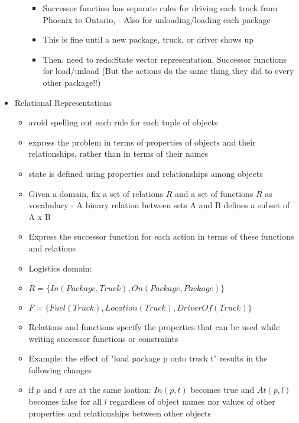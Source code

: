 \documentclass[10pt]{article}
\begin{document}
\begin{itemize}[label=\(\star\), leftmargin=1em, itemsep=-0.3em]
\begin{itemize}[label=\(\star\), leftmargin=1em, itemsep=-0.2em]
        \begin{itemize}[label=\(\star\), leftmargin=1em, itemsep=-0.2em]
            \item Successor function has separate rules for driving each truck from Phoenix to Ontario,  - Also for unloading/loading each package
            \item This is fine until a new package, truck, or driver shows up
            \item Then, need to redo:State vector representation,  Successor functions for load/unload (But the actions do the same thing they did to every other package!!)
        \end{itemize}
\end{itemize}

\item Relational Representations
\begin{itemize}[label=\(\star\), leftmargin=1em, itemsep=-0.2em]

    \item avoid spelling out each rule for each tuple of objects
    \item express the problem in terms of properties of objects and their relationships, rather than in terms of their names
    \item state is defined using properties and relationships among objects
    \item Given a domain, fix a set of relations $R$  and a set of functions $R$ as vocabulary - A binary relation between sets A and B defines a subset of A x B
    \item Express the successor function for each action in terms of these functions and relations
    \item  Logistics domain:
    \item[] $R = \{In(Package,Truck),On(Package, Package)\}$
    \item[] $F = \{Fuel(Truck), Location(Truck), DriverOf(Truck)\}$
    \item Relations and functions specify the properties that can be used while writing successor functions or constraints
    \item Example: the effect of "load package p onto truck t" results in the following changes
    \item[] if $p$ and $t$ are at the same loation: $In(p,t)$ becomes true and $At(p, l)$ becomes false for all $l$ regardless of object names nor values of other properties and relationships between other objects
\end{itemize}



\end{itemize}
\end{document}
